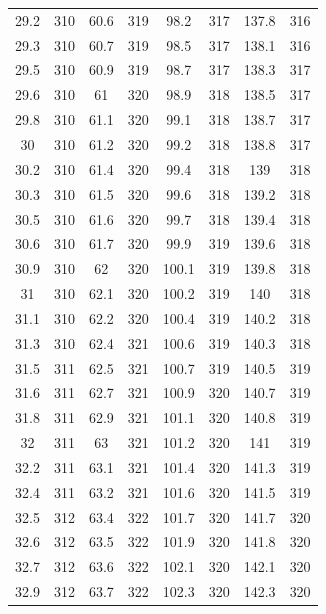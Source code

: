 \documentclass[12pt]{ctexart}
\numberwithin{equation}{section}
\begin{document}
\begin{longtable}{cc|cc|cc|cc}
29.2  &  310  &  60.6  &  319  &  98.2  &  317  &  137.8  &  316  \\
29.3  &  310  &  60.7  &  319  &  98.5  &  317  &  138.1  &  316  \\
29.5  &  310  &  60.9  &  319  &  98.7  &  317  &  138.3  &  317  \\
29.6  &  310  &  61  &  320  &  98.9  &  318  &  138.5  &  317  \\
29.8  &  310  &  61.1  &  320  &  99.1  &  318  &  138.7  &  317  \\
30  &  310  &  61.2  &  320  &  99.2  &  318  &  138.8  &  317  \\
30.2  &  310  &  61.4  &  320  &  99.4  &  318  &  139  &  318  \\
30.3  &  310  &  61.5  &  320  &  99.6  &  318  &  139.2  &  318  \\
30.5  &  310  &  61.6  &  320  &  99.7  &  318  &  139.4  &  318  \\
30.6  &  310  &  61.7  &  320  &  99.9  &  319  &  139.6  &  318  \\
30.9  &  310  &  62  &  320  &  100.1  &  319  &  139.8  &  318  \\
31  &  310  &  62.1  &  320  &  100.2  &  319  &  140  &  318  \\
31.1  &  310  &  62.2  &  320  &  100.4  &  319  &  140.2  &  318  \\
31.3  &  310  &  62.4  &  321  &  100.6  &  319  &  140.3  &  318  \\
31.5  &  311  &  62.5  &  321  &  100.7  &  319  &  140.5  &  319  \\
31.6  &  311  &  62.7  &  321  &  100.9  &  320  &  140.7  &  319  \\
31.8  &  311  &  62.9  &  321  &  101.1  &  320  &  140.8  &  319  \\
32  &  311  &  63  &  321  &  101.2  &  320  &  141  &  319  \\
32.2  &  311  &  63.1  &  321  &  101.4  &  320  &  141.3  &  319  \\
32.4  &  311  &  63.2  &  321  &  101.6  &  320  &  141.5  &  319  \\
32.5  &  312  &  63.4  &  322  &  101.7  &  320  &  141.7  &  320  \\
32.6  &  312  &  63.5  &  322  &  101.9  &  320  &  141.8  &  320  \\
32.7  &  312  &  63.6  &  322  &  102.1  &  320  &  142.1  &  320  \\
32.9  &  312  &  63.7  &  322  &  102.3  &  320  &  142.3  &  320  \\

\end{longtable}
\end{document}
